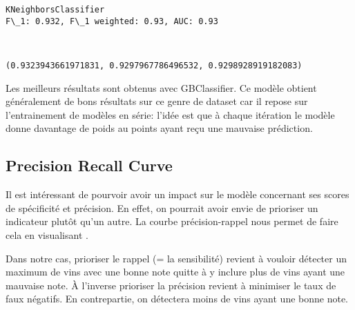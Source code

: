 \documentclass[11pt]{article}
\makeatletter
\newcommand{\boxspacing}{\kern\kvtcb@left@rule\kern\kvtcb@boxsep}
\newcommand{\prompt}[4]{
        {\ttfamily\llap{{\color{#2}[#3]:\hspace{3pt}#4}}\vspace{-\baselineskip}}
    }
\makeatother
\begin{document}
    \begin{Verbatim}[commandchars=\\\{\}]
KNeighborsClassifier
F\_1: 0.932, F\_1 weighted: 0.93, AUC: 0.93
    \end{Verbatim}

    \begin{center}
    \end{center}
    { \hspace*{\fill} \\}
    
            \begin{tcolorbox}[breakable, size=fbox, boxrule=.5pt, pad at break*=1mm, opacityfill=0]
\prompt{Out}{outcolor}{39}{\boxspacing}
\begin{Verbatim}[commandchars=\\\{\}]
(0.9323943661971831, 0.9297967786496532, 0.9298928919182083)
\end{Verbatim}
\end{tcolorbox}
        
    Les meilleurs résultats sont obtenus avec GBClassifier. Ce modèle
obtient généralement de bons résultats sur ce genre de dataset car il
repose sur l'entrainement de modèles en série: l'idée est que à chaque
itération le modèle donne davantage de poids au points ayant reçu une
mauvaise prédiction.

    \hypertarget{precision-recall-curve}{%
\subsection{Precision Recall Curve}\label{precision-recall-curve}}

    Il est intéressant de pourvoir avoir un impact sur le modèle concernant
ses scores de spécificité et précision. En effet, on pourrait avoir
envie de prioriser un indicateur plutôt qu'un autre. La courbe
précision-rappel nous permet de faire cela en visualisant .

Dans notre cas, prioriser le rappel (= la sensibilité) revient à vouloir
détecter un maximum de vins avec une bonne note quitte à y inclure plus
de vins ayant une mauvaise note. À l'inverse prioriser la précision
revient à minimiser le taux de faux négatifs. En contrepartie, on
détectera moins de vins ayant une bonne note.
\end{document}
